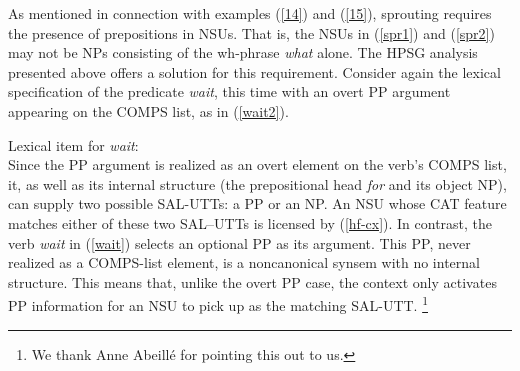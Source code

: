 {As mentioned in connection with examples (\ref{14}) and (\ref{15}), sprouting requires the presence of prepositions in NSUs. That is, the NSUs in (\ref{spr1}) and (\ref{spr2}) may not be NPs consisting of the wh-phrase {\it what} alone.  
%
%
%
%
The HPSG analysis presented above offers a solution for
this requirement. Consider again the lexical specification of the predicate \textit{wait}, this time with an overt PP argument appearing on the COMPS list, as in (\ref{wait2}).

\ea
\label{wait2}
Lexical item for \textit{wait}:\\
\z
%
Since the PP argument is realized as an 
overt element on the verb's COMPS list, it, as well as its internal structure (the prepositional head 
{\it for} and its object NP), can supply
two possible SAL-UTTs: a PP or an NP. An NSU whose CAT feature matches either of these two SAL–UTTs is licensed by (\ref{hf-cx}). In contrast, the verb {\it wait} in (\ref{wait}) selects an optional PP as its
argument. This PP, never realized as a COMPS-list element, is a noncanonical synsem with no internal structure.  This means that, unlike the overt PP case, the context only activates PP 
information for an NSU to pick up as the matching SAL-UTT. %
\footnote{We thank Anne Abeill\'{e} for pointing this out to us.}

}
